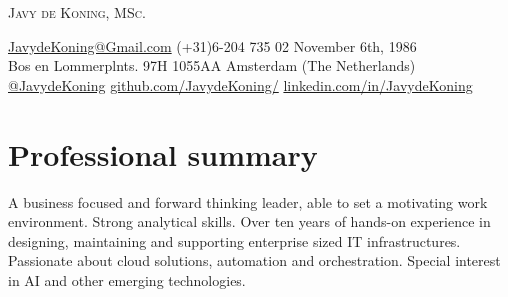 \begin{center}

\fontsize{28}{28}\selectfont\scshape
Javy de Koning, MSc.\\

\fontsize{10}{10}\selectfont\scshape

{\faEnvelope } \url{JavydeKoning@Gmail.com} {\faPhoneSquare} (+31)6-204 735 02 {\faCalendar} November 6th, 1986\\

{\faMapMarker} Bos en Lommerplnts. 97H {\large\textperiodcentered} 1055AA {\large\textperiodcentered} Amsterdam (The Netherlands) \\

{\faTwitterSquare} \href{https://twitter.com/javydekoning}{@JavydeKoning} {\faGithubSquare} \url{github.com/JavydeKoning/} {\faLinkedinSquare} \url{linkedin.com/in/JavydeKoning}

\end{center}

\section{\faUser\hspace{0.1cm}Professional summary}
A business focused and forward thinking leader, able to set a motivating work environment. Strong analytical skills. Over ten years of hands-on experience in designing, maintaining and supporting enterprise sized IT infrastructures. Passionate about cloud solutions, automation and orchestration. Special interest in AI and other emerging technologies.